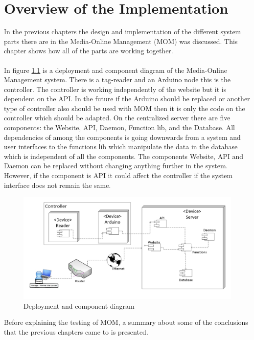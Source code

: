 \chapter{Overview of the Implementation}

In the previous chapters the design and implementation of the different system parts there are in the Media-Online Management (MOM) was discussed.
This chapter shows how all of the parts are working together.\\
\\
In figure \ref{fig:deployment} is a deployment and component diagram of the Media-Online Management system. There is a tag-reader and an Arduino node this is the controller. The controller is working independently of the website but it is dependent on the API. In the future if the Arduino should be replaced or another type of controller also should be used with MOM then it is only the code on the controller which should be adapted. 
On the centralized server there are five components: the Website, API, Daemon, Function lib, and the Database. All dependencies of among the components is going downwards from a system and user interfaces to the functions lib which manipulate the data in the database which is independent of all the components.
 The components Website, API and Daemon can be replaced without changing anything further in the system. However, if the component is API it could affect the controller if the system interface does not remain the same.
    
\begin{figure}
	\centering
		\includegraphics[width=1.50\textwidth, angle=90 ]{images/deployment.jpg}
	\caption{Deployment and component diagram}
	\label{fig:deployment}
\end{figure}


Before explaining the testing of MOM, a summary about some of the conclusions that the previous chapters came to is presented.

